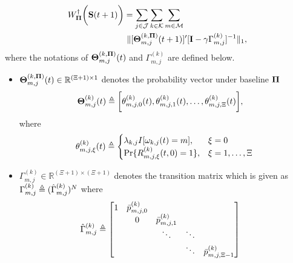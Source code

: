 \begin{lemma}
    \begin{align}
        &W^{\dagger}_{\boldsymbol{\Pi}}\bigg(\mathbf{S}(t+1)\bigg) = \sum_{j\in\mathcal{J}}\sum_{k\in\mathcal{K}}\sum_{m\in\mathcal{M}}
        \nonumber\\
        &~~~~~~~~~~~~~~~~~~~~~\lVert
            [ \boldsymbol{\Theta}^{(k, \boldsymbol{\Pi})}_{m,j}(t+1) ]'
            [
                \mathbf{I} - \gamma \Gamma^{(k)}_{m,j}
            ]^{-1}
        \|_1,
        \label{w_ap}
    \end{align}
    where the notations of $\boldsymbol{\Theta}^{(k, \boldsymbol{\Pi})}_{m,j}(t)$ and $\Gamma^{(k)}_{m,j}$ are defined below.
    \begin{itemize}
        \item $\boldsymbol{\Theta}^{(k, \boldsymbol{\Pi})}_{m,j}(t) \in \mathbb{R}^{(\Xi+1) \times 1}$ denotes the probability vector under baseline $\boldsymbol{\Pi}$
        \begin{align}
            \boldsymbol{\Theta}^{(k)}_{m,j}(t) &\triangleq
            \bigg[ \theta^{(k)}_{m,j,0}(t), \theta^{(k)}_{m,j,1}(t), \dots, \theta^{(k)}_{m,j,\Xi}(t) \bigg],
        \end{align}
        where 
        \begin{align}
            \theta^{(k)}_{m,j,\xi}(t) \triangleq 
            \begin{cases}
                \lambda_{k,j} I[\omega_{k,j}(t)=m], & \xi=0
                \\
                \Pr\{R^{(k)}_{m,j,\xi}(t,0) = 1\}, & \xi=1,\dots,\Xi
            \end{cases}
        \end{align}
        \item $\Gamma^{(k)}_{m,j} \in \mathbb{R}^{(\Xi+1) \times (\Xi+1)}$ denotes the transition matrix which is given as $\Gamma^{(k)}_{m,j} \triangleq (\hat{\Gamma}^{(k)}_{m,j})^N$ where
        \begin{align}
            \hat{\Gamma}^{(k)}_{m,j} &\triangleq
            \begin{bmatrix}
                1 & \bar{p}^{(k)}_{m,j,0} &                       &        &                           \\
                  & 0                     & \bar{p}^{(k)}_{m,j,1} &        &                           \\
                  &                       & \ddots                & \ddots &                           \\
                  &                       &                       & \ddots & \bar{p}^{(k)}_{m,j,\Xi-1} \\

\end{bmatrix}
\end{align}
\end{itemize}
\end{lemma}
